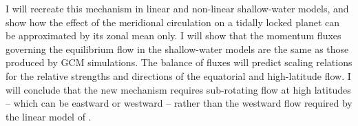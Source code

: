 I will recreate this mechanism in linear and non-linear shallow-water models, and show how the effect of the meridional circulation on a tidally locked planet can be approximated by its zonal mean only. I will show that the momentum fluxes governing the equilibrium flow in the shallow-water models are the same as those produced by GCM simulations. The balance of fluxes will predict scaling relations for the relative strengths and directions of the equatorial and high-latitude flow. I will conclude that the new mechanism requires sub-rotating flow at high latitudes -- which can be eastward or westward -- rather than the westward flow required by the linear model of \citet{showman2011superrotation}.

%






